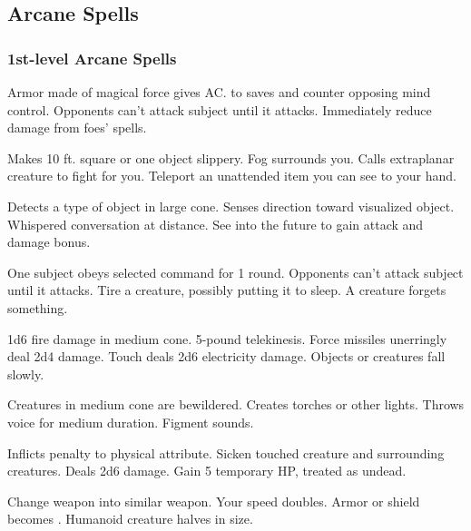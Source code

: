 \subsection{Arcane Spells}\label{Arcane Spells}
\subsubsection{1st-level Arcane Spells}
\begin{swspelllist}
     Armor made of magical force gives  AC.
    to saves and counter opposing mind control.
   Opponents can't attack subject until it attacks.
   Immediately reduce damage from foes' spells.

   Makes 10 ft. square or one object slippery.
   Fog surrounds you.
   Calls extraplanar creature to fight for you.
   Teleport an unattended item you can see to your hand.

   Detects a type of object in large cone.
   Senses direction toward visualized object.
   Whispered conversation at distance.
   See into the future to gain attack and damage bonus.

   One subject obeys selected command for 1 round.
   Opponents can't attack subject until it attacks.
   Tire a creature, possibly putting it to sleep.
   A creature forgets something.

   1d6 fire damage in medium cone.
   5-pound telekinesis.
   Force missiles unerringly deal 2d4 damage.
   Touch deals 2d6 electricity damage.
   Objects or creatures fall slowly.

   Creatures in medium cone are bewildered.
   Creates torches or other lights.
   Throws voice for medium duration.
   Figment sounds.

   Inflicts  penalty to physical attribute.
   Sicken touched creature and surrounding creatures.
   Deals 2d6 damage.
   Gain 5 temporary HP, treated as undead.

   Change weapon into similar weapon.
   Your speed doubles.
   Armor or shield becomes .
   Humanoid creature halves in size.
\end{swspelllist}

